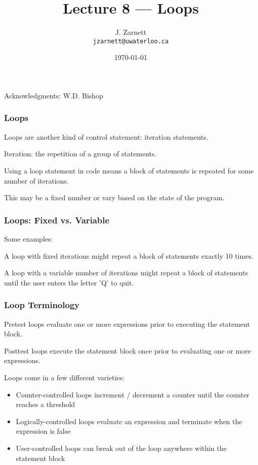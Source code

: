 

\title{Lecture 8 --- Loops }

\author{J. Zarnett\\
\texttt{jzarnett@uwaterloo.ca}}
\date{\today}



\begin{frame}
  \titlepage
  
  \begin{center}
  \small{Acknowledgments: W.D. Bishop}
  \end{center}
 \end{frame}
 
\begin{frame}
\frametitle{Loops}

Loops are another kind of control statement: \alert{iteration} statements.

Iteration: the repetition of a group of statements.

Using a loop statement in code means a block of statements is repeated for some number of iterations.

This may be a fixed number or vary based on the state of the program.

\end{frame}

\begin{frame}
\frametitle{Loops: Fixed vs. Variable}

Some examples:

A loop with fixed iterations might repeat a block of statements exactly 10 times.

A loop with a variable number of iterations might repeat a block of statements until the user enters the letter 'Q' to quit.

\end{frame}


\begin{frame}
\frametitle{Loop Terminology}

\alert{Pretest} loops evaluate one or more expressions prior to executing the statement block.

\alert{Posttest} loops execute the statement block once prior to evaluating one or more expressions.

Loops come in a few different varieties:

\begin{itemize}
	\item Counter-controlled loops increment / decrement a counter until the counter reaches a threshold
	\item Logically-controlled loops evaluate an expression and terminate when the expression is false
	\item User-controlled loops can break out of the loop anywhere within the statement block
\end{itemize}

\end{frame}

